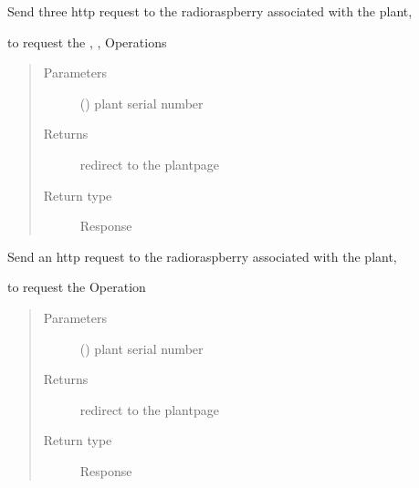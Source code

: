 \documentclass[letterpaper,10pt,english]{sphinxmanual}
\begin{document}

\begin{fulllineitems}
\label{\detokenize{index:view.plant.vase_state_req}}
Send three http request to the radio\sphinxhyphen{}raspberry associated with the plant,

to request the , ,   Operations
\begin{quote}\begin{description}
\item[{Parameters}] \leavevmode
{} () \textendash{} plant serial number

\item[{Returns}] \leavevmode
redirect to the plantpage

\item[{Return type}] \leavevmode
Response

\end{description}\end{quote}

\end{fulllineitems}


\begin{fulllineitems}
\label{\detokenize{index:view.plant.water}}
Send an http request to the radio\sphinxhyphen{}raspberry associated with the plant,

to request the  Operation
\begin{quote}\begin{description}
\item[{Parameters}] \leavevmode
{} () \textendash{} plant serial number

\item[{Returns}] \leavevmode
redirect to the plantpage

\item[{Return type}] \leavevmode
Response

\end{description}\end{quote}

\end{fulllineitems}
\end{document}
